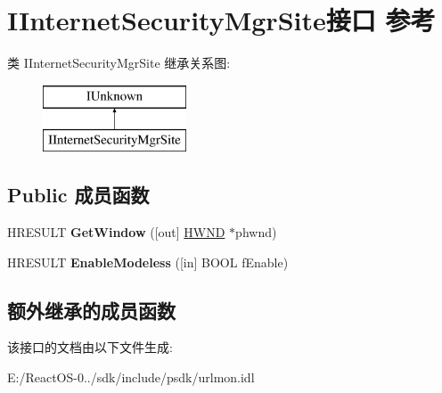 \hypertarget{interface_i_internet_security_mgr_site}{}\section{I\+Internet\+Security\+Mgr\+Site接口 参考}
\label{interface_i_internet_security_mgr_site}
类 I\+Internet\+Security\+Mgr\+Site 继承关系图\+:\begin{figure}[H]
\begin{center}
\leavevmode
\includegraphics[height=2.000000cm]{interface_i_internet_security_mgr_site}
\end{center}
\end{figure}
\subsection*{Public 成员函数}
\begin{DoxyCompactItemize}
\item 
\mbox{\label{interface_i_internet_security_mgr_site_adf7b96fd3f1ed891f0a1226ab8cfc06f}} 
H\+R\+E\+S\+U\+LT {\bfseries Get\+Window} (\mbox{[}out\mbox{]} \hyperlink{interfacevoid}{H\+W\+ND} $\ast$phwnd)
\item 
\mbox{\label{interface_i_internet_security_mgr_site_a1a31397af9be6531833ee7de92829a66}} 
H\+R\+E\+S\+U\+LT {\bfseries Enable\+Modeless} (\mbox{[}in\mbox{]} B\+O\+OL f\+Enable)
\end{DoxyCompactItemize}
\subsection*{额外继承的成员函数}


该接口的文档由以下文件生成\+:\begin{DoxyCompactItemize}
\item 
E\+:/\+React\+O\+S-\/0../sdk/include/psdk/urlmon.\+idl\end{DoxyCompactItemize}
